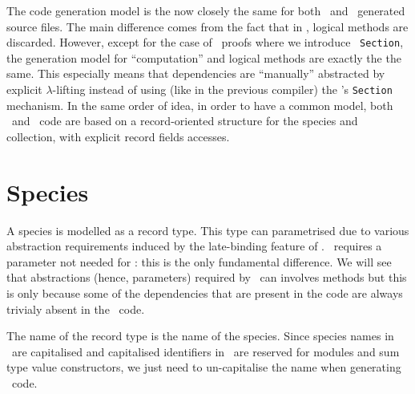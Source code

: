 
The code generation model is the now closely the same for both \ocaml\
and \coq\ generated source files. The main difference comes from the
fact that in \ocaml, logical methods are discarded. However, except
for the case of \zenon\ proofs where we introduce \coq\ {\tt Section},
the generation model for ``computation'' and logical methods are
exactly the the same. This especially means that dependencies are
``manually'' abstracted by explicit $\lambda$-lifting instead of using
(like in the previous compiler) the \coq's {\tt Section}
mechanism. In the same order of idea, in order to have a common model,
both \ocaml\ and \coq\ code are based on a record-oriented structure
for the species and collection, with explicit record fields accesses.

\section{Species}
A species is modelled as a record type. This type can parametrised due
to various abstraction requirements induced by the late-binding
feature of \focalize. \ocaml\ requires a parameter not needed for
\coq: this is the only fundamental difference. We will see that
abstractions (hence, parameters) required by \coq\ can involves
methods but this is only because some of the dependencies that are
present in the \coq code are always trivialy absent in the
\ocaml\ code.

The name of the record type is the name of the species. Since species
names in \focalize\ are capitalised and capitalised identifiers in
\ocaml\ are reserved for modules and sum type value constructors, we
just need to un-capitalise the name when generating \ocaml\ code.

